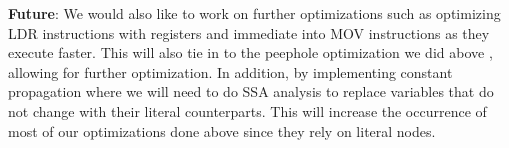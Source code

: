 \documentclass[11pt,a4paper]{article}
\begin{document}
\noindent \textbf{Future}: We would also like to work on further optimizations such as optimizing LDR instructions with registers and immediate into MOV instructions as they execute faster. This will also tie in to the peephole optimization we did above , allowing for further optimization. In addition, by implementing constant propagation where we will need to do SSA analysis to replace variables that do not change with their literal counterparts. This will increase the occurrence of most of our optimizations done above since they rely on literal nodes.
\end{document}
